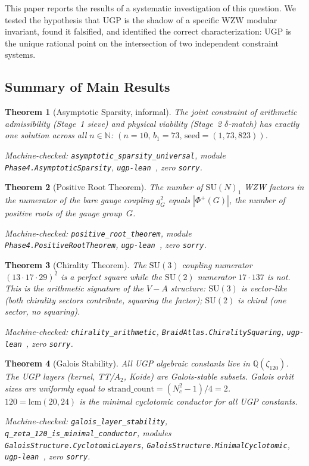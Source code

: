 \documentclass[11pt]{article}
\newtheorem{theorem}{Theorem}[section]
\theoremstyle{remark}
\newcommand{\Nc}{N_c}
\newcommand{\bone}{b_1}
\newcommand{\zetaN}[1]{\zeta_{#1}}
\newcommand{\PhiPlus}{\Phi^+}
\begin{document}
This paper reports the results of a systematic investigation of this question.
We tested the hypothesis that UGP is the shadow of a specific WZW modular invariant,
found it falsified, and identified the correct characterization: UGP is the unique
rational point on the intersection of two independent constraint systems.

\subsection{Summary of Main Results}
\label{subsec:summary}

\begin{theorem}[Asymptotic Sparsity, informal]
The joint constraint of arithmetic admissibility (Stage~1 sieve) and physical
viability (Stage~2 $\delta$-match) has exactly one solution across all $n \in \mathbb{N}$:
$(n{=}10,\,\bone{=}73,\,\text{seed}=(1,73,823))$.

\medskip\noindent
\textit{Machine-checked: \texttt{asymptotic\_sparsity\_universal},
module \texttt{Phase4.AsymptoticSparsity}, \texttt{ugp-lean}~\cite{ugp-lean}, zero \texttt{sorry}.}
\end{theorem}

\begin{theorem}[Positive Root Theorem]
The number of $\mathrm{SU}(N)_1$ WZW factors in the numerator of the bare gauge
coupling $g_G^2$ equals $|\PhiPlus(G)|$, the number of positive roots of the gauge
group~$G$.

\medskip\noindent
\textit{Machine-checked: \texttt{positive\_root\_theorem},
module \texttt{Phase4.PositiveRootTheorem}, \texttt{ugp-lean}~\cite{ugp-lean}, zero \texttt{sorry}.}
\end{theorem}

\begin{theorem}[Chirality Theorem]
The $\mathrm{SU}(3)$ coupling numerator $(13 \cdot 17 \cdot 29)^2$ is a perfect square
while the $\mathrm{SU}(2)$ numerator $17 \cdot 137$ is not.
This is the arithmetic signature of the $V{-}A$ structure: $\mathrm{SU}(3)$ is
vector-like (both chirality sectors contribute, squaring the factor);
$\mathrm{SU}(2)$ is chiral (one sector, no squaring).

\medskip\noindent
\textit{Machine-checked: \texttt{chirality\_arithmetic},
\texttt{BraidAtlas.ChiralitySquaring},
\texttt{ugp-lean}~\cite{ugp-lean}, zero \texttt{sorry}.}
\end{theorem}

\begin{theorem}[Galois Stability]
All UGP algebraic constants live in $\mathbb{Q}(\zetaN{120})$.
The UGP layers (kernel, TT/$A_2$, Koide) are Galois-stable subsets.
Galois orbit sizes are uniformly equal to $\mathrm{strand\_count} = (\Nc^2-1)/4 = 2$.
$120 = \mathrm{lcm}(20,24)$ is the minimal cyclotomic conductor for all UGP constants.

\medskip\noindent
\textit{Machine-checked: \texttt{galois\_layer\_stability}, \texttt{q\_zeta\_120\_is\_minimal\_conductor},
modules \texttt{GaloisStructure.CyclotomicLayers}, \texttt{GaloisStructure.MinimalCyclotomic},
\texttt{ugp-lean}~\cite{ugp-lean}, zero \texttt{sorry}.}
\end{theorem}
\end{document}
